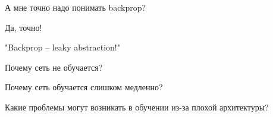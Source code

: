 \documentclass[notes,12pt, aspectratio=169]{beamer}
\newenvironment{wideitemize}{\itemize\addtolength{\itemsep}{10pt}}{\enditemize}
\begin{document}
\begin{frame}{А мне точно надо понимать backprop?}
	\begin{wideitemize}
		\item  \alert{Да, точно!} 
				
		\item  "Backprop – leaky abstraction!"
		
		\item  Почему сеть не обучается?
		
		\item  Почему сеть обучается слишком медленно? 
		
		\item  Какие проблемы могут возникать в обучении из-за плохой архитектуры? 
	\end{wideitemize}
\end{frame}
\end{document}
